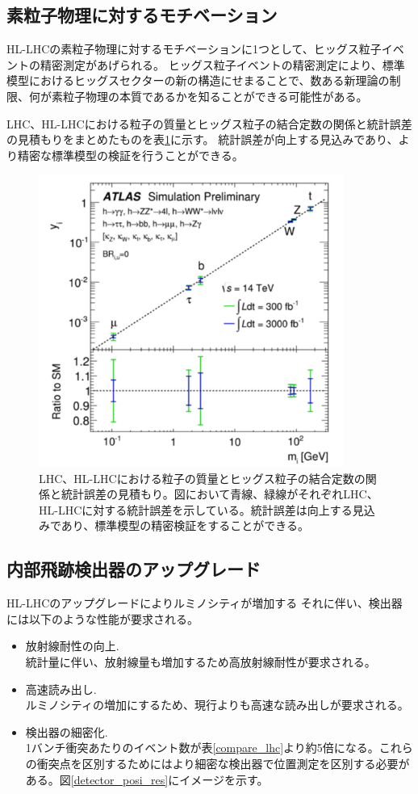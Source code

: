 \subsection{素粒子物理に対するモチベーション}
HL-LHCの素粒子物理に対するモチベーションに1つとして、ヒッグス粒子イベントの精密測定があげられる。
ヒッグス粒子イベントの精密測定により、標準模型におけるヒッグスセクターの新の構造にせまることで、数ある新理論の制限、何が素粒子物理の本質であるかを知ることができる可能性がある。

LHC、HL-LHCにおける粒子の質量とヒッグス粒子の結合定数の関係と統計誤差の見積もりをまとめたものを表\ref{higgs_uncertainty}に示す。
統計誤差が向上する見込みであり、より精密な標準模型の検証を行うことができる。

\begin{figure}[bpt]\centering
\includegraphics[width=10cm]{./higgs_uncertainty.pdf}
\caption[LHC、HL-LHCにおける粒子の質量とヒッグス粒子の結合定数の関係と統計誤差の見積もり]{LHC、HL-LHCにおける粒子の質量とヒッグス粒子の結合定数の関係と統計誤差の見積もり\cite{1-12}。図において青線、緑線がそれぞれLHC、HL-LHCに対する統計誤差を示している。統計誤差は向上する見込みであり、標準模型の精密検証をすることができる。}
\label{higgs_uncertainty}
\end{figure}


\subsection{内部飛跡検出器のアップグレード}
HL-LHCのアップグレードによりルミノシティが増加する
それに伴い、検出器には以下のような性能が要求される。

\begin{itemize}
  \item 放射線耐性の向上.\\
  統計量に伴い、放射線量も増加するため高放射線耐性が要求される。
  \item 高速読み出し.\\
  ルミノシティの増加にするため、現行よりも高速な読み出しが要求される。
  \item 検出器の細密化.\\
  1バンチ衝突あたりのイベント数が表\ref{compare_lhc}より約5倍になる。これらの衝突点を区別するためにはより細密な検出器で位置測定を区別する必要がある。図\ref{detector_posi_res}にイメージを示す。
\end{itemize}


